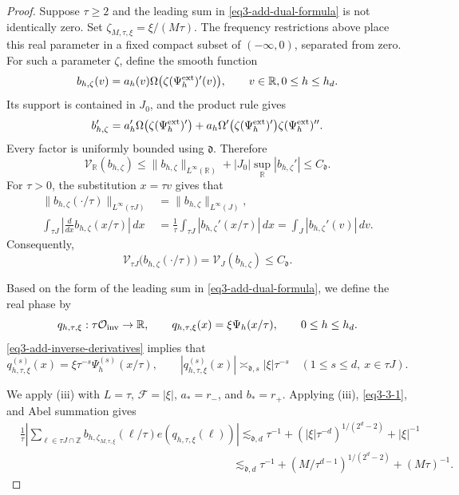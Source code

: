 \documentclass[reqno,12pt]{amsart}
\def \Z {\mathbb Z}
\def \R {\mathbb R}
\numberwithin{equation}{section}
\begin{document}
\begin{proof}
Suppose $\tau\ge2$ and the leading sum in
\eqref{eq3-add-dual-formula} is not identically zero.
Set $\zeta_{M,\tau,\xi}=\xi/(M\tau)$. The frequency restrictions
above place this real parameter in a fixed compact subset of
$(-\infty,0)$, separated from zero.
For such a parameter $\zeta$, define the smooth function
\[
 b_{h,\zeta}(v)=a_h(v)
       \Omega\bigl(\zeta(\Psi_h^{\rm ext})'(v)\bigr),\qquad v\in\R,0\le h\le h_d.
\]
Its support is contained in $J_0$, and the product rule gives
\[
 b_{h,\zeta}'=a_h'\Omega\bigl(\zeta(\Psi_h^{\rm ext})'\bigr)
 +a_h\Omega'\bigl(\zeta(\Psi_h^{\rm ext})'\bigr)
                                  \zeta(\Psi_h^{\rm ext})''.
\]
Every factor is uniformly bounded using $\mathfrak d$. Therefore
\[
 \mathcal V_\R(b_{h,\zeta})
 \le\|b_{h,\zeta}\|_{L^{\infty}(\R)}+|J_0|\sup_\R|b_{h,\zeta}'|
 \le C_{\mathfrak d}.
\]
For $\tau>0$, the substitution $x=\tau v$ gives that 
\[
\begin{aligned}
\|b_{h,\zeta}(\cdot/\tau)\|_{L^\infty(\tau J)}
&=\|b_{h,\zeta}\|_{L^\infty(J)},\\
\int_{\tau J}
\left|\frac{d}{dx}b_{h,\zeta}(x/\tau)\right|\,dx
&=\frac1\tau\int_{\tau J}|b_{h,\zeta}'(x/\tau)|\,dx
=\int_J|b_{h,\zeta}'(v)|\,dv.
\end{aligned}
\]
Consequently,
\begin{equation}\label{eq3-3-1}
	\mathcal V_{\tau J}\bigl(b_{h,\zeta}(\cdot/\tau)\bigr)
	=\mathcal V_J(b_{h,\zeta})
	\le C_{\mathfrak d}.
\end{equation}

Based on the form of the leading sum in \eqref{eq3-add-dual-formula}, we define the real phase by
\[
 q_{h,\tau,\xi}:\tau\mathcal O_{\rm inv}\to\R,
 \qquad q_{h,\tau,\xi}(x)=\xi\Psi_h(x/\tau),\qquad 0\le h\le h_d.
\]
\eqref{eq3-add-inverse-derivatives} implies that 
\[
 q_{h,\tau,\xi}^{(s)}(x)=\xi\tau^{-s}\Psi_h^{(s)}(x/\tau),\qquad
 |q_{h,\tau,\xi}^{(s)}(x)|\asymp_{\mathfrak d,s}|\xi|\tau^{-s}
                    \quad(1\le s\le d,\ x\in\tau J).
\]

We apply (iii) with
$L=\tau$, $\mathcal F=|\xi|$,
$a_*=r_-$, and $b_*=r_+$. 
Applying
(iii),
\eqref{eq3-3-1}, and Abel summation gives
\[
 \begin{split}
 &\frac1\tau\left|\sum_{\ell\in\tau J\cap\Z}
 b_{h,\zeta_{M,\tau,\xi}}(\ell/\tau)
                         e(q_{h,\tau,\xi}(\ell))\right|
 \lesssim_{\mathfrak d,d}
   \tau^{-1}+(|\xi|\tau^{-d})^{1/(2^d-2)}+|\xi|^{-1}\\
 &\hspace{8cm}\lesssim_{\mathfrak d,d}
   \tau^{-1}+(M/\tau^{d-1})^{1/(2^d-2)}+(M\tau)^{-1}.
 \end{split}
\]


\end{proof}
\end{document}
